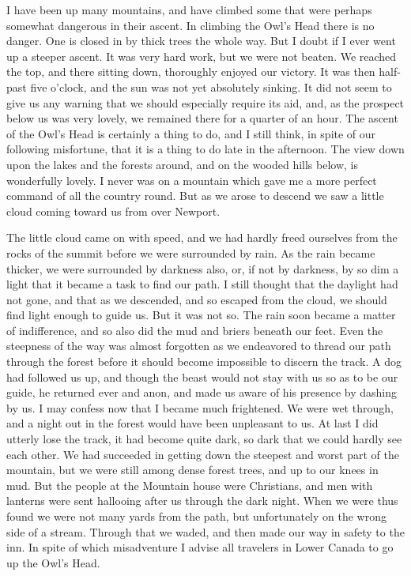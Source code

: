 I have been up many mountains, and have climbed some that were
perhaps somewhat dangerous in their ascent.  In climbing the Owl's
Head there is no danger.  One is closed in by thick trees the whole
way.  But I doubt if I ever went up a steeper ascent.  It was very
hard work, but we were not beaten.  We reached the top, and there
sitting down, thoroughly enjoyed our victory.  It was then half-
past five o'clock, and the sun was not yet absolutely sinking.  It
did not seem to give us any warning that we should especially
require its aid, and, as the prospect below us was very lovely, we
remained there for a quarter of an hour.  The ascent of the Owl's
Head is certainly a thing to do, and I still think, in spite of our
following misfortune, that it is a thing to do late in the
afternoon.  The view down upon the lakes and the forests around,
and on the wooded hills below, is wonderfully lovely.  I never was
on a mountain which gave me a more perfect command of all the
country round.  But as we arose to descend we saw a little cloud
coming toward us from over Newport.

The little cloud came on with speed, and we had hardly freed
ourselves from the rocks of the summit before we were surrounded by
rain.  As the rain became thicker, we were surrounded by darkness
also, or, if not by darkness, by so dim a light that it became a
task to find our path.  I still thought that the daylight had not
gone, and that as we descended, and so escaped from the cloud, we
should find light enough to guide us.  But it was not so.  The rain
soon became a matter of indifference, and so also did the mud and
briers beneath our feet.  Even the steepness of the way was almost
forgotten as we endeavored to thread our path through the forest
before it should become impossible to discern the track.  A dog had
followed us up, and though the beast would not stay with us so as
to be our guide, he returned ever and anon, and made us aware of
his presence by dashing by us.  I may confess now that I became
much frightened.  We were wet through, and a night out in the
forest would have been unpleasant to us.  At last I did utterly
lose the track, it had become quite dark, so dark that we could
hardly see each other.  We had succeeded in getting down the
steepest and worst part of the mountain, but we were still among
dense forest trees, and up to our knees in mud.  But the people at
the Mountain house were Christians, and men with lanterns were sent
hallooing after us through the dark night.  When we were thus found
we were not many yards from the path, but unfortunately on the
wrong side of a stream.  Through that we waded, and then made our
way in safety to the inn.  In spite of which misadventure I advise
all travelers in Lower Canada to go up the Owl's Head.

